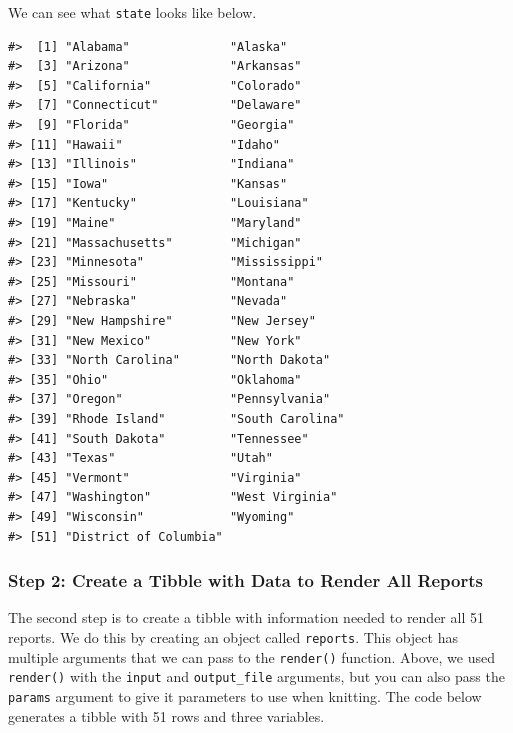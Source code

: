 \documentclass[
]{book}
\begin{document}
We can see what \texttt{state} looks like below.

\begin{verbatim}
#>  [1] "Alabama"              "Alaska"              
#>  [3] "Arizona"              "Arkansas"            
#>  [5] "California"           "Colorado"            
#>  [7] "Connecticut"          "Delaware"            
#>  [9] "Florida"              "Georgia"             
#> [11] "Hawaii"               "Idaho"               
#> [13] "Illinois"             "Indiana"             
#> [15] "Iowa"                 "Kansas"              
#> [17] "Kentucky"             "Louisiana"           
#> [19] "Maine"                "Maryland"            
#> [21] "Massachusetts"        "Michigan"            
#> [23] "Minnesota"            "Mississippi"         
#> [25] "Missouri"             "Montana"             
#> [27] "Nebraska"             "Nevada"              
#> [29] "New Hampshire"        "New Jersey"          
#> [31] "New Mexico"           "New York"            
#> [33] "North Carolina"       "North Dakota"        
#> [35] "Ohio"                 "Oklahoma"            
#> [37] "Oregon"               "Pennsylvania"        
#> [39] "Rhode Island"         "South Carolina"      
#> [41] "South Dakota"         "Tennessee"           
#> [43] "Texas"                "Utah"                
#> [45] "Vermont"              "Virginia"            
#> [47] "Washington"           "West Virginia"       
#> [49] "Wisconsin"            "Wyoming"             
#> [51] "District of Columbia"
\end{verbatim}

\hypertarget{step-2-create-a-tibble-with-data-to-render-all-reports}{%
\subsubsection*{Step 2: Create a Tibble with Data to Render All Reports}\label{step-2-create-a-tibble-with-data-to-render-all-reports}}

The second step is to create a tibble with information needed to render all 51 reports. We do this by creating an object called \texttt{reports}. This object has multiple arguments that we can pass to the \texttt{render()} function. Above, we used \texttt{render()} with the \texttt{input} and \texttt{output\_file} arguments, but you can also pass the \texttt{params} argument to give it parameters to use when knitting. The code below generates a tibble with 51 rows and three variables.
\end{document}
